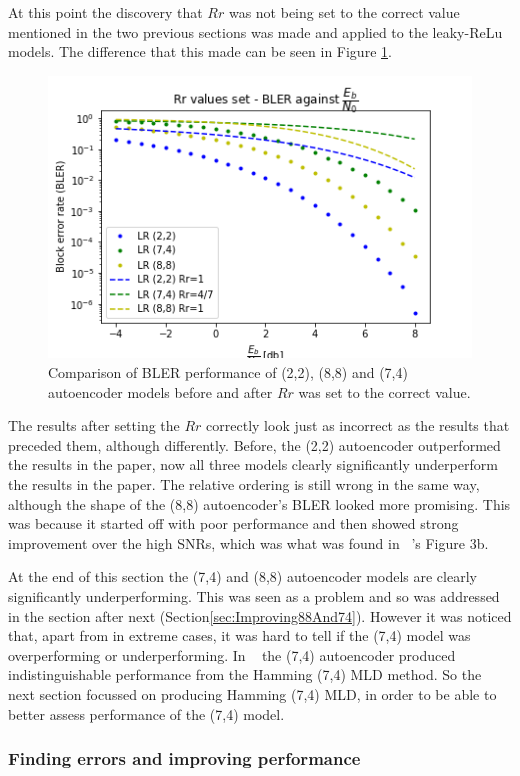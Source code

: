\documentclass[12pt,onecolumn,letterpaper]{article}
\begin{document}
At this point the discovery that $Rr$ was not being set to the correct value mentioned in the two previous sections was made and applied to the leaky-ReLu models. The difference that this made can be seen in Figure \ref{fig:AutoencodersAllRr1Comparison}.

\begin{figure}
   \centering
   \includegraphics[width=0.6\linewidth]{figures/autoencoders248_bler_EbNo_Rr1_comparison.png}
   \caption{Comparison of BLER performance of (2,2), (8,8) and (7,4) autoencoder models before and after $Rr$ was set to the correct value. }
   \label{fig:AutoencodersAllRr1Comparison}
\end{figure}

The results after setting the $Rr$ correctly look just as incorrect as the results that preceded them, although differently. Before, the (2,2) autoencoder outperformed the results in the paper, now all three models clearly significantly underperform the results in the paper. The relative ordering is still wrong in the same way, although the shape of the (8,8) autoencoder's BLER looked more promising. This was because it started off with poor performance and then showed strong improvement over the high SNRs, which was what was found in ~\cite{oShea}'s Figure 3b.

At the end of this section the (7,4) and (8,8) autoencoder models are clearly significantly underperforming. This was seen as a problem and so was addressed in the section after next (Section\ref{sec:Improving88And74}). However it was noticed that, apart from in extreme cases, it was hard to tell if the (7,4) model was overperforming or underperforming. In ~\cite{oShea} the (7,4) autoencoder produced indistinguishable performance from the Hamming (7,4) MLD method. So the next section focussed on producing Hamming (7,4) MLD, in order to be able to better assess performance of the (7,4) model.

\subsubsection{Finding errors and improving performance}
\end{document}
